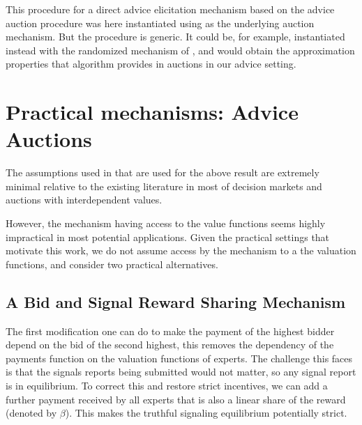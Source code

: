 This procedure for a direct advice elicitation mechanism based on the advice auction procedure was here instantiated using \cite{maskin1992auctions}  as the underlying auction mechanism. But the procedure is generic. It could be, for example, instantiated instead with the randomized mechanism of \cite{eden2018interdependent}, and would obtain the approximation properties that algorithm provides in auctions in our advice setting.


\section{Practical mechanisms: Advice Auctions}

The assumptions used in \cite{roughgarden2016optimal} that are used for the above result are extremely minimal relative to the existing literature in most of decision markets and auctions with interdependent values.

However, the mechanism having access to the value functions seems highly impractical in most potential applications.
Given the practical settings that motivate this work, 
we do not assume access by the mechanism to a the valuation functions, and consider two practical alternatives.


\subsection{A Bid and Signal Reward Sharing Mechanism}

The first modification one can do to make the payment of the highest bidder depend on the bid of the second highest, this removes the dependency of the payments function on the 
valuation functions of experts.
The challenge this faces is that the signals reports being submitted would not matter, so any signal report is in equilibrium. To correct this and restore strict incentives, we can add a further payment received by all experts that is also a linear share of the reward (denoted by $\beta$). This makes the truthful signaling equilibrium potentially strict.


